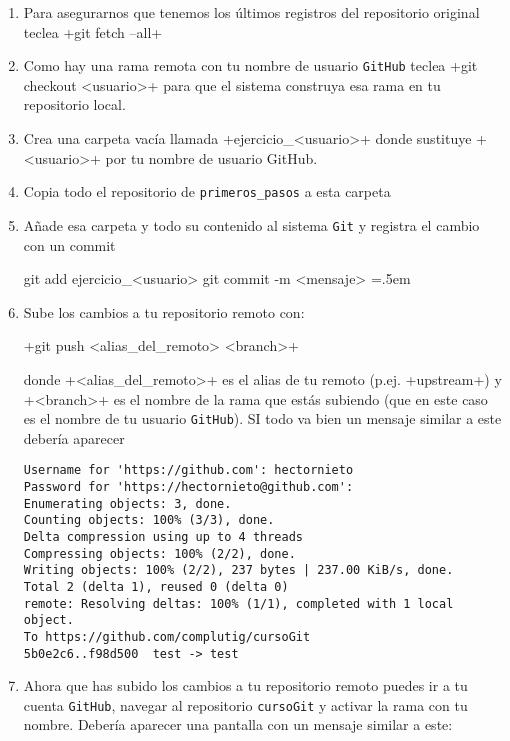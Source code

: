 \documentclass[a5paper,10pt]{article}
\newenvironment{cverbatim}
 {\SaveVerbatim{cverb}}
 {\endSaveVerbatim
  \flushleft\fboxrule=0pt\fboxsep=.5em
  \colorbox{bg}{\BUseVerbatim{cverb}}%
  \endflushleft
}
\begin{document}
    \begin{enumerate}
     \item Para asegurarnos que tenemos los últimos registros del repositorio original teclea \cverb+git fetch --all+
     
     \item Como hay una rama remota con tu nombre de usuario \verb+GitHub+ teclea \cverb+git checkout <usuario>+ para que el sistema construya esa rama en tu repositorio local.
     
     \item Crea una carpeta vacía llamada \cverb+ejercicio_<usuario>+ donde sustituye \cverb+<usuario>+ por tu nombre de usuario GitHub.
     
     \item Copia todo el repositorio de \verb+primeros_pasos+ a esta carpeta
     
     \item Añade esa carpeta y todo su contenido al sistema \verb+Git+ y registra el cambio con un commit
     
     \begin{cverbatim}
git add ejercicio_<usuario>
git commit -m <mensaje>
     \end{cverbatim}
     
     \item Sube los cambios a tu repositorio remoto con:
     
     \cverb+git push <alias_del_remoto> <branch>+
     
     donde \cverb+<alias_del_remoto>+ es el alias de tu remoto (p.ej. \cverb+upstream+) y \cverb+<branch>+ es el nombre de la rama que estás subiendo (que en este caso es el nombre de tu usuario \verb+GitHub+). SI todo va bien un mensaje similar a este debería aparecer
     
     \begin{lstlisting}[style=custom]
Username for 'https://github.com': hectornieto
Password for 'https://hectornieto@github.com': 
Enumerating objects: 3, done.
Counting objects: 100% (3/3), done.
Delta compression using up to 4 threads
Compressing objects: 100% (2/2), done.
Writing objects: 100% (2/2), 237 bytes | 237.00 KiB/s, done.
Total 2 (delta 1), reused 0 (delta 0)
remote: Resolving deltas: 100% (1/1), completed with 1 local object.
To https://github.com/complutig/cursoGit
5b0e2c6..f98d500  test -> test
     \end{lstlisting}
     
     \item Ahora que has subido los cambios a tu repositorio remoto puedes ir a tu cuenta \verb+GitHub+, navegar al repositorio \verb+cursoGit+ y activar la rama con tu nombre. Debería aparecer una pantalla con un mensaje similar a este:
     

\end{enumerate}
\end{document}
